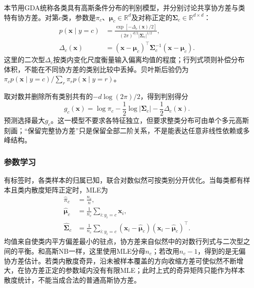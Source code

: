 本节用GDA统称各类具有高斯条件分布的判别模型，并分别讨论共享协方差与类特有协方差。对第$c$类，参数是$\pi_c$、$\bm{\mu}_c\in\mathbb{R}^{d}$及对称正定的$\bm{\Sigma}_c\in\mathbb{R}^{d\times d}$：
\begin{equation}
  \label{eq:classification-gda-density}
  \begin{aligned}
    p(\bm{x}\mid y=c)
      &=\frac{\exp[-\Delta_c(\bm{x})/2]}
        {(2\pi)^{d/2}|\bm{\Sigma}_c|^{1/2}},\\
    \Delta_c(\bm{x})
      &=(\bm{x}-\bm{\mu}_c)^{\top}
        \bm{\Sigma}_c^{-1}(\bm{x}-\bm{\mu}_c).
  \end{aligned}
\end{equation}
这里的二次型$\Delta_c$按类内变化尺度衡量输入偏离均值的程度；行列式项则补偿分布体积，不能在不同协方差的类别比较中丢掉。贝叶斯后验仍为$\pi_cp(\bm{x}\mid y=c)/\sum_r\pi_rp(\bm{x}\mid y=r)$。

取对数并删除所有类别共有的$-d\log(2\pi)/2$，得到判别得分
\begin{equation}
  \label{eq:classification-gda-score}
  g_c(\bm{x})
  =\log\pi_c-\frac12\log|\bm{\Sigma}_c|
   -\frac12\Delta_c(\bm{x}).
\end{equation}
预测选择最大$g_c$。这一模型不要求各特征独立，但要求整类分布可由单个多元高斯刻画；“保留完整协方差”只是保留全部二阶关系，不是能表达任意非线性依赖或多峰结构。

\subsubsection{参数学习}
\label{sec:classification-gda-learning}

有标签时，各类样本的归属已知，联合对数似然可按类别分开优化。当每类都有样本且类内散度矩阵正定时，MLE为
\begin{equation}
  \label{eq:classification-gda-estimates}
  \begin{aligned}
    \hat\pi_c&=\frac{n_c}{n},\\
    \hat{\bm{\mu}}_c
      &=\frac{1}{n_c}\sum_{i:y_i=c}\bm{x}_i,\\
    \hat{\bm{\Sigma}}_c
      &=\frac{1}{n_c}\sum_{i:y_i=c}
        (\bm{x}_i-\hat{\bm{\mu}}_c)
        (\bm{x}_i-\hat{\bm{\mu}}_c)^{\top}.
  \end{aligned}
\end{equation}
均值来自使类内平方偏差最小的驻点，协方差来自似然中的对数行列式与二次型之间的平衡。和高斯NB一样，这里使用MLE分母$n_c$；若改用$n_c-1$，得到的是无偏协方差估计。若类内散度奇异，沿未被样本覆盖的方向收缩方差可使似然不断增大，在协方差正定的参数域内没有有限MLE；此时上式的奇异矩阵只能作为样本散度统计，不能当成合法的普通高斯协方差。

